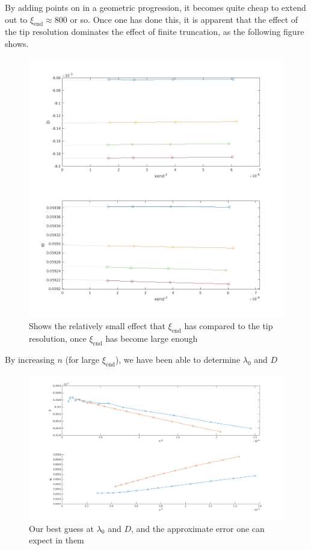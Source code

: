 \documentclass{jfm}
\begin{document}
By adding points on in a geometric progression, it becomes quite cheap to
extend out to $\xi_{\mbox{end}} \approx 800$ or so. Once one has done this,
it is apparent that the effect of the tip resolution dominates the effect
of finite truncation, as the following figure shows.
\begin{figure}
  \centerline{\includegraphics[scale=0.3]{./../../Graphs/xend-effect-l0-D.png}}
  \caption{Shows the relatively small effect that $\xi_{\mathrm{end}}$ has
compared to the tip resolution, once $\xi_{\mathrm{end}}$ has become large
enough}
\end{figure}

By increasing $n$ (for large $\xi_{\mathrm{end}}$), we have been able to 
determine $\lambda_0$ and $D$
\begin{figure}
  \centerline{\includegraphics[scale=0.3]{./../../Graphs/l0-D-too-far.png}}
  \caption{Our best guess at $\lambda_0$ and $D$, and the approximate error
one can expect in them}
\end{figure}
\end{document}
